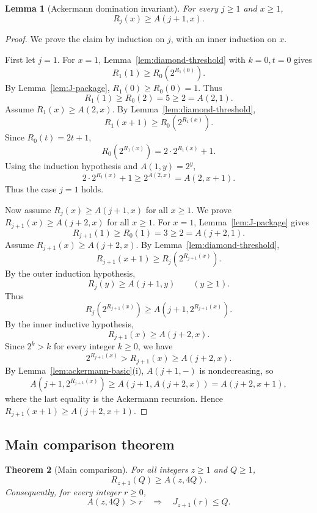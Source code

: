 ﻿\documentclass[11pt]{article}
\newtheorem{theorem}{Theorem}[section]
\newtheorem{lemma}[theorem]{Lemma}
\begin{document}
\begin{lemma}[Ackermann domination invariant]\label{lem:ackermann-domination}
For every $j\ge1$ and $x\ge1$,
\[
R_j(x)\ge A(j+1,x).
\]
\end{lemma}

\begin{proof}
We prove the claim by induction on $j$, with an inner induction on $x$.

First let $j=1$.  For $x=1$, Lemma~\ref{lem:diamond-threshold} with $k=0,t=0$ gives
\[
R_1(1)\ge R_0(2^{R_1(0)}).
\]
By Lemma~\ref{lem:J-package}, $R_1(0)\ge R_0(0)=1$.  Thus
\[
R_1(1)\ge R_0(2)=5\ge2=A(2,1).
\]
Assume $R_1(x)\ge A(2,x)$.  By Lemma~\ref{lem:diamond-threshold},
\[
R_1(x+1)\ge R_0(2^{R_1(x)}).
\]
Since $R_0(t)=2t+1$,
\[
R_0(2^{R_1(x)})=2\cdot2^{R_1(x)}+1.
\]
Using the induction hypothesis and $A(1,y)=2^y$,
\[
2\cdot2^{R_1(x)}+1\ge2^{A(2,x)}=A(2,x+1).
\]
Thus the case $j=1$ holds.

Now assume $R_j(x)\ge A(j+1,x)$ for all $x\ge1$.  We prove $R_{j+1}(x)\ge A(j+2,x)$ for all $x\ge1$.  For $x=1$, Lemma~\ref{lem:J-package} gives
\[
R_{j+1}(1)\ge R_0(1)=3\ge2=A(j+2,1).
\]
Assume $R_{j+1}(x)\ge A(j+2,x)$.  By Lemma~\ref{lem:diamond-threshold},
\[
R_{j+1}(x+1)\ge R_j(2^{R_{j+1}(x)}).
\]
By the outer induction hypothesis,
\[
R_j(y)\ge A(j+1,y)\qquad(y\ge1).
\]
Thus
\[
R_j(2^{R_{j+1}(x)})\ge A(j+1,2^{R_{j+1}(x)}).
\]
By the inner inductive hypothesis,
\[
R_{j+1}(x)\ge A(j+2,x).
\]
Since $2^k>k$ for every integer $k\ge0$, we have
\[
2^{R_{j+1}(x)}>R_{j+1}(x)\ge A(j+2,x).
\]
By Lemma~\ref{lem:ackermann-basic}(i), $A(j+1,-)$ is nondecreasing, so
\[
A(j+1,2^{R_{j+1}(x)})\ge A(j+1,A(j+2,x))=A(j+2,x+1),
\]
where the last equality is the Ackermann recursion.  Hence $R_{j+1}(x+1)\ge A(j+2,x+1)$.
\end{proof}

\subsection{Main comparison theorem}

\begin{theorem}[Main comparison]\label{thm:main-comparison}
For all integers $z\ge1$ and $Q\ge1$,
\[
R_{z+1}(Q)\ge A(z,4Q).
\]
Consequently, for every integer $r\ge0$,
\[
A(z,4Q)>r\quad\Longrightarrow\quad J_{z+1}(r)\le Q.
\]
\end{theorem}
\end{document}
